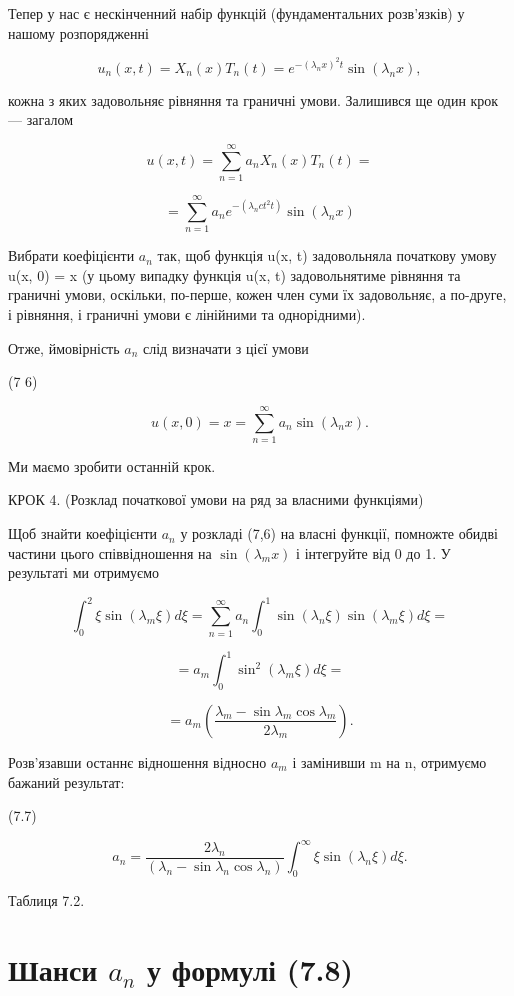 \documentclass[
  ukrainian,
]{article}
\begin{document}
Тепер у нас є нескінченний набір функцій (фундаментальних розв'язків) у
нашому розпорядженні

\[
u_n(x, t) = X_n(x) T_n(t) = e^{-(\lambda_n x)^2 t} \sin(\lambda_n x),
\]

кожна з яких задовольняє рівняння та граничні умови. Залишився ще один
крок --- загалом

\[
u(x, t) = \sum_{n=1}^{\infty} a_n X_n(x) T_n(t) =
\]

\[
= \sum_{n=1}^{\infty} a_n e^{-(\lambda_n c t^2 t)} \sin(\lambda_n x)
\]

Вибрати коефіцієнти \(a_n\) так, щоб функція u(x, t) задовольняла
початкову умову u(x, 0) = x (у цьому випадку функція u(x, t)
задовольнятиме рівняння та граничні умови, оскільки, по-перше, кожен
член суми їх задовольняє, а по-друге, і рівняння, і граничні умови є
лінійними та однорідними).

Отже, ймовірність \(a_n\) слід визначати з цієї умови

(7 6)

\[
u(x, 0) = x = \sum_{n=1}^{\infty} a_n \sin(\lambda_n x).
\]

Ми маємо зробити останній крок.

КРОК 4. (Розклад початкової умови на ряд за власними функціями)

Щоб знайти коефіцієнти \(a_n\) у розкладі (7,6) на власні функції,
помножте обидві частини цього співвідношення на \(\sin(\lambda_m x)\) і
інтегруйте від 0 до 1. У результаті ми отримуємо

\[
\int_{0}^{2} \xi \sin(\lambda_{m} \xi) d\xi = \sum_{n=1}^{\infty} a_{n} \int_{0}^{1} \sin(\lambda_{n} \xi) \sin(\lambda_{m} \xi) d\xi =
\]

\[
= a_{m} \int_{0}^{1} \sin^{2}(\lambda_{m} \xi) d\xi =
\]

\[
= a_{m} \left( \frac{\lambda_{m} - \sin \lambda_{m} \cos \lambda_{m}}{2\lambda_{m}} \right).
\]

Розв'язавши останнє відношення відносно \(a_m\) і замінивши m на n,
отримуємо бажаний результат:

(7.7)

\[
a_n = \frac{2\lambda_n}{(\lambda_n - \sin \lambda_n \cos \lambda_n)} \int_0^{\infty} \xi \sin (\lambda_n \xi) d\xi.
\]

Таблиця 7.2.

\section{\texorpdfstring{Шанси \(a_n\) у формулі
(7.8)}{Шанси a\_n у формулі (7.8)}}\label{ux448ux430ux43dux441ux438-a_n-ux443-ux444ux43eux440ux43cux443ux43bux456-7.8}
\end{document}

